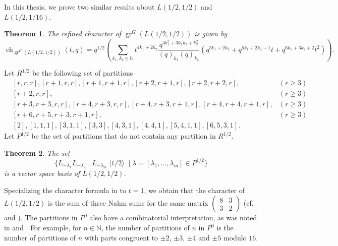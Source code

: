 \documentclass[a4paper, 12pt, reqno]{amsart}
\newtheorem{theorem}{Theorem}[section]
\theoremstyle{remark}
\DeclareMathOperator{\gr}{gr}
\DeclareMathOperator{\ch}{ch}
\DeclareMathOperator{\vachalf}{|1/2\rangle}
\begin{document}
In this thesis, we prove two similar results about $L(1/2, 1/2)$ and $L(1/2, 1/16)$.

\begin{theorem}
  \label{thr:3}
  The refined character of $\gr^G(L(1/2, 1/2))$ is given by
  \begin{equation*}
    \ch_{\gr^G(L(1/2, 1/2))}(t, q) = q^{1/2}\left(\sum_{k_1, k_2 \in \mathbb{N}}t^{4k_1 + 2k_2}\frac{q^{4k_1^2 + 3k_1k_2 + k_2^2}}{(q)_{k_1}(q)_{k_2}}(q^{3k_1 + 2k_2} + q^{5k_1 + 2k_2 + 1}t + q^{6k_1 + 3k_2 + 2}t^2)\right).
  \end{equation*}
\end{theorem}

Let $R^{1/2}$ be the following set of partitions
\begin{align*}
  &[r, r, r], [r + 1, r, r], [r + 1, r + 1, r], [r + 2, r + 1, r], [r + 2, r + 2, r], &(r \ge 3) \\
  &[r + 2, r, r], &(r \ge 3) \\
  &[r + 3, r + 3, r, r], [r + 4, r + 3, r, r],  [r + 4, r + 3, r + 1, r], [r + 4, r + 4, r + 1, r], &(r \ge 3)\\
  &[r + 6, r + 5, r + 3, r + 1, r], &(r \ge 3) \\
  &[2], [1, 1, 1], [3, 1, 1], [3, 3], [4, 3, 1], [4, 4, 1], [5, 4, 1, 1], [6, 5, 3, 1].
\end{align*}
Let $P^{1/2}$ be the set of partitions that do not contain any partition in $R^{1/2}$.

\begin{theorem}
  \label{thr:4}
  The set
  \begin{equation*}
    \{L_{-\lambda_1}L_{-\lambda_2}\dots L_{-\lambda_m}\vachalf \mid \lambda = [\lambda_1, \dots, \lambda_m] \in P^{1/2}\}
  \end{equation*}
  is a vector space basis of $L(1/2, 1/2)$.
\end{theorem}

Specializing the character formula in  to $t = 1$, we obtain that the character of $L(1/2, 1/2)$ is the sum of three Nahm sums for the same matrix $\left(\begin{smallmatrix} 8 & 3 \\ 3 & 2 \end{smallmatrix}\right)$ (cf.\ \cite{Nahm2007} and \cite{andrews_singular_2022}).
The partitions in $P^0$ also have a combinatorial interpretation, as was noted in \cite{andrews_singular_2022} and \cite{tsuchioka_vertex_2023}.
For example, for $n \in \mathbb{N}$, the number of partitions of $n$ in $P^0$ is the number of partitions of $n$ with parts congruent to $\pm 2$, $\pm 3$, $\pm 4$ and $\pm 5$ modulo $16$.
\end{document}
